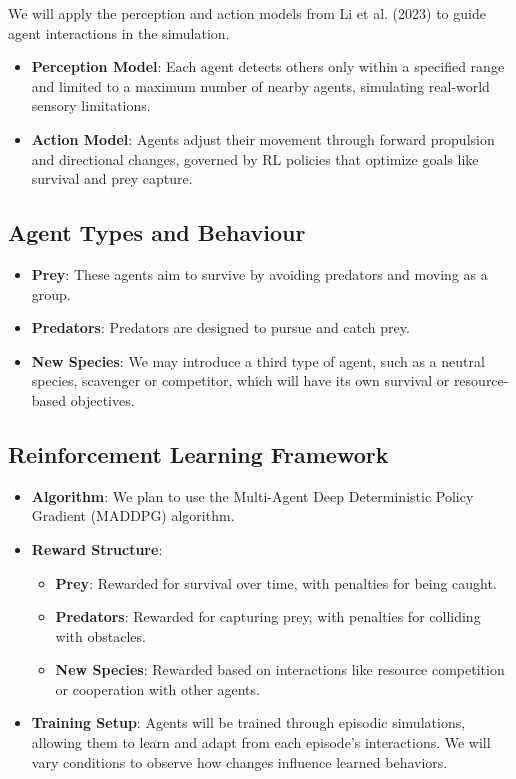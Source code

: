 \documentclass[9pt]{pnas-new}
\begin{document}
We will apply the perception and action models from Li et al. (2023) \cite{li2023predator} to guide agent interactions in the simulation.

\begin{itemize}
    \item \textbf{Perception Model}: Each agent detects others only within a specified range and limited to a maximum number of nearby agents, simulating real-world sensory limitations.
    \item \textbf{Action Model}: Agents adjust their movement through forward propulsion and directional changes, governed by RL policies that optimize goals like survival and prey capture.
\end{itemize}

\subsection{Agent Types and Behaviour}
\begin{itemize}
    \item \textbf{Prey}: These agents aim to survive by avoiding predators and moving as a group.
    \item \textbf{Predators}: Predators are designed to pursue and catch prey.
    \item \textbf{New Species}: We may introduce a third type of agent, such as a neutral species, scavenger or competitor, which will have its own survival or resource-based objectives.
\end{itemize}

\subsection{Reinforcement Learning Framework}
\begin{itemize}
    \item \textbf{Algorithm}: We plan to use the Multi-Agent Deep Deterministic Policy Gradient (MADDPG) algorithm.
    \item \textbf{Reward Structure}:
        \begin{itemize}
            \item \textbf{Prey}: Rewarded for survival over time, with penalties for being caught.
            \item \textbf{Predators}: Rewarded for capturing prey, with penalties for colliding with obstacles.
            \item \textbf{New Species}: Rewarded based on interactions like resource competition or cooperation with other agents.
        \end{itemize}
    \item \textbf{Training Setup}: Agents will be trained through episodic simulations, allowing them to learn and adapt from each episode's interactions. We will vary conditions to observe how changes influence learned behaviors.
\end{itemize}
\end{document}
